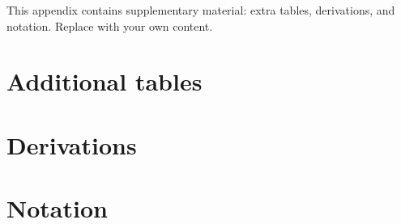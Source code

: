 %

This appendix contains supplementary material: extra tables, derivations, and notation. Replace with your own content.

\section{Additional tables}

\lipsum[61-63]

\section{Derivations}

\lipsum[64-66]

\section{Notation}

\lipsum[70]
